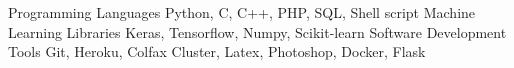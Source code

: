\begin{cvhonorsx}
  \cvhonorx
    {Programming Languages}
    {Python, C, C++, PHP, SQL, Shell script}
    {}
    {}
  \cvhonorx
    {Machine Learning Libraries}
    {Keras, Tensorflow, Numpy, Scikit-learn}
    {}
    {}
  \cvhonorx
    {Software Development Tools}
    {Git, Heroku, Colfax Cluster, Latex, Photoshop, Docker, Flask}
    {}
    {}
\end{cvhonorsx}
